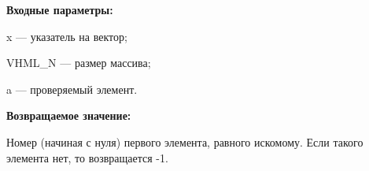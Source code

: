 \textbf{Входные параметры:}

   x --- указатель на вектор;
   
 VHML\_N --- размер массива;
 
 a --- проверяемый элемент.

\textbf{Возвращаемое значение:}

 Номер (начиная с нуля) первого элемента, равного искомому. Если такого элемента нет, то возвращается -1.